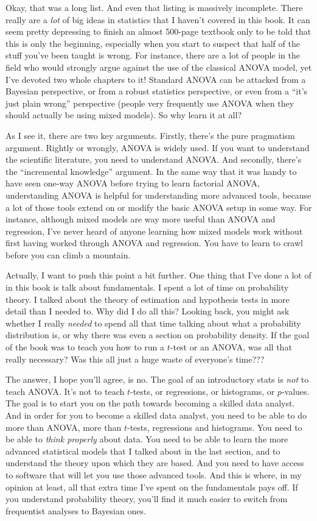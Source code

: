 Okay, that was a long list. And even that listing is massively incomplete. There really are a {\it lot} of big ideas in statistics that I haven't covered in this book. It can seem pretty depressing to finish an almost 500-page textbook only to be told that this is only the beginning, especially when you start to suspect that half of the stuff you've been taught is wrong. For instance, there are a lot of people in the field who would strongly argue against the use of the classical ANOVA model, yet I've devoted two whole chapters to it! Standard ANOVA can be attacked from a Bayesian perspective, or from a robust statistics perspective, or even from a ``it's just plain wrong'' perspective (people very frequently use ANOVA when they should actually be using mixed models). So why learn it at all? 

As I see it, there are two key arguments. Firstly, there's the pure pragmatism argument. Rightly or wrongly, ANOVA is widely used. If you want to understand the scientific literature, you need to understand ANOVA. And secondly, there's the ``incremental knowledge'' argument. In the same way that it was handy to have seen one-way ANOVA before trying to learn factorial ANOVA, understanding ANOVA is helpful for understanding more advanced tools, because a lot of those tools extend on or modify the basic ANOVA setup in some way. For instance, although mixed models are way more useful than ANOVA and regression, I've never heard of anyone learning how mixed models work without first having worked through ANOVA and regression. You have to learn to crawl before you can climb a mountain.

Actually, I want to push this point a bit further. One thing that I've done a lot of in this book is talk about fundamentals. I spent a lot of time on probability theory. I talked about the theory of estimation and hypothesis tests in more detail than I needed to. Why did I do all this? Looking back, you might ask whether I really {\it needed} to spend all that time talking about what a probability distribution is, or why there was even a section on probability density. If the goal of the book was to teach you how to run a $t$-test or an ANOVA, was all that really necessary? Was this all just a huge waste of everyone's time???

The answer, I hope you'll agree, is no. The goal of an introductory stats is {\it not} to teach ANOVA. It's not to teach $t$-tests, or regressions, or histograms, or $p$-values. The goal is to start you on the path towards becoming a skilled data analyst. And in order for you to become a skilled data analyst, you need to be able to do more than ANOVA, more than $t$-tests, regressions and histograms. You need to be able to {\it think properly} about data. You need to be able to learn the more advanced statistical models that I talked about in the last section, and to understand the theory upon which they are based. And you need to have access to software that will let you use those advanced tools. And this is where, in my opinion at least, all that extra time I've spent on the fundamentals pays off. If you understand probability theory, you'll find it much easier to switch from frequentist analyses to Bayesian ones. 

